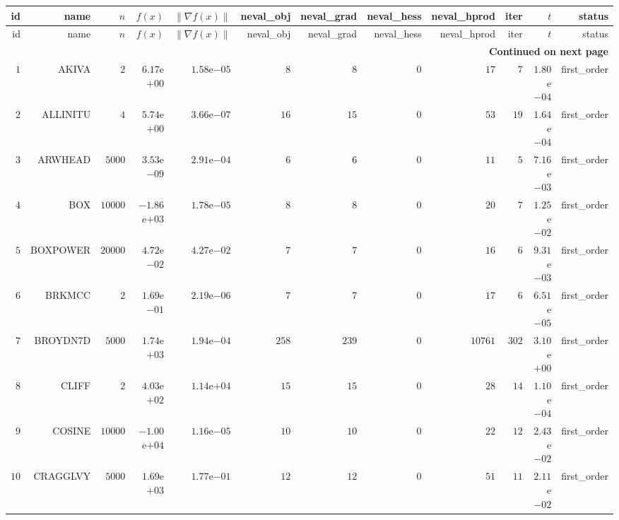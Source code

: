 \begin{longtable}{rrrrrrrrrrrr}
  \hline
  id & name & \(n\) & \(f(x)\) & \(\|\nabla f(x)\|\) & neval\_obj & neval\_grad & neval\_hess & neval\_hprod & iter & \(t\) & status \\\hline
  \endfirsthead
  \hline
  id & name & \(n\) & \(f(x)\) & \(\|\nabla f(x)\|\) & neval\_obj & neval\_grad & neval\_hess & neval\_hprod & iter & \(t\) & status \\\hline
  \endhead
  \hline
  \multicolumn{12}{r}{{\bfseries Continued on next page}}\\
  \hline
  \endfoot
  \endlastfoot
  \(     1\) & AKIVA & \(     2\) & \( 6.17\)e\(+00\) & \( 1.58\)e\(-05\) & \(     8\) & \(     8\) & \(     0\) & \(    17\) & \(     7\) & \( 1.80\)e\(-04\) & first\_order \\
  \(     2\) & ALLINITU & \(     4\) & \( 5.74\)e\(+00\) & \( 3.66\)e\(-07\) & \(    16\) & \(    15\) & \(     0\) & \(    53\) & \(    19\) & \( 1.64\)e\(-04\) & first\_order \\
  \(     3\) & ARWHEAD & \(  5000\) & \( 3.53\)e\(-09\) & \( 2.91\)e\(-04\) & \(     6\) & \(     6\) & \(     0\) & \(    11\) & \(     5\) & \( 7.16\)e\(-03\) & first\_order \\
  \(     4\) & BOX & \( 10000\) & \(-1.86\)e\(+03\) & \( 1.78\)e\(-05\) & \(     8\) & \(     8\) & \(     0\) & \(    20\) & \(     7\) & \( 1.25\)e\(-02\) & first\_order \\
  \(     5\) & BOXPOWER & \( 20000\) & \( 4.72\)e\(-02\) & \( 4.27\)e\(-02\) & \(     7\) & \(     7\) & \(     0\) & \(    16\) & \(     6\) & \( 9.31\)e\(-03\) & first\_order \\
  \(     6\) & BRKMCC & \(     2\) & \( 1.69\)e\(-01\) & \( 2.19\)e\(-06\) & \(     7\) & \(     7\) & \(     0\) & \(    17\) & \(     6\) & \( 6.51\)e\(-05\) & first\_order \\
  \(     7\) & BROYDN7D & \(  5000\) & \( 1.74\)e\(+03\) & \( 1.94\)e\(-04\) & \(   258\) & \(   239\) & \(     0\) & \( 10761\) & \(   302\) & \( 3.10\)e\(+00\) & first\_order \\
  \(     8\) & CLIFF & \(     2\) & \( 4.03\)e\(+02\) & \( 1.14\)e\(+04\) & \(    15\) & \(    15\) & \(     0\) & \(    28\) & \(    14\) & \( 1.10\)e\(-04\) & first\_order \\
  \(     9\) & COSINE & \( 10000\) & \(-1.00\)e\(+04\) & \( 1.16\)e\(-05\) & \(    10\) & \(    10\) & \(     0\) & \(    22\) & \(    12\) & \( 2.43\)e\(-02\) & first\_order \\
  \(    10\) & CRAGGLVY & \(  5000\) & \( 1.69\)e\(+03\) & \( 1.77\)e\(-01\) & \(    12\) & \(    12\) & \(     0\) & \(    51\) & \(    11\) & \( 2.11\)e\(-02\) & first\_order \\

\end{longtable}
